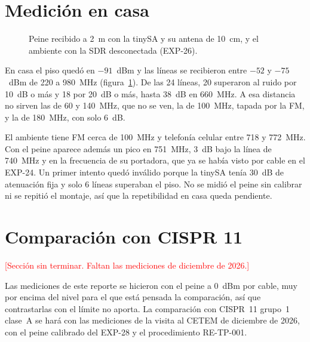 \documentclass[11pt,a4paper]{article}
\newcommand{\pendiente}[1]{\textcolor{red}{[#1]}}
\begin{document}
\section{Medición en casa}

\begin{figure}[H]
  \centering
  \caption{Peine recibido a 2~m con la tinySA y su antena de 10~cm, y el ambiente con la SDR desconectada (EXP-26).}
  \label{fig:casa}
\end{figure}

En casa el piso quedó en $-91$~dBm y las líneas se recibieron entre $-52$ y $-75$~dBm de 220 a 980~MHz (figura~\ref{fig:casa}). De las 24 líneas, 20 superaron al ruido por 10~dB o más y 18 por 20~dB o más, hasta 38~dB en 660~MHz. A esa distancia no sirven las de 60 y 140~MHz, que no se ven, la de 100~MHz, tapada por la FM, y la de 180~MHz, con solo 6~dB.

El ambiente tiene FM cerca de 100~MHz y telefonía celular entre 718 y 772~MHz. Con el peine aparece además un pico en 751~MHz, 3~dB bajo la línea de 740~MHz y en la frecuencia de su portadora, que ya se había visto por cable en el EXP-24. Un primer intento quedó inválido porque la tinySA tenía 30~dB de atenuación fija y solo 6 líneas superaban el piso. No se midió el peine sin calibrar ni se repitió el montaje, así que la repetibilidad en casa queda pendiente.

\section{Comparación con CISPR 11}

\pendiente{Sección sin terminar. Faltan las mediciones de diciembre de 2026.}

Las mediciones de este reporte se hicieron con el peine a 0~dBm por cable, muy por encima del nivel para el que está pensada la comparación, así que contrastarlas con el límite no aporta. La comparación con CISPR~11 grupo~1 clase~A se hará con las mediciones de la visita al CETEM de diciembre de 2026, con el peine calibrado del EXP-28 y el procedimiento RE-TP-001.
\end{document}
